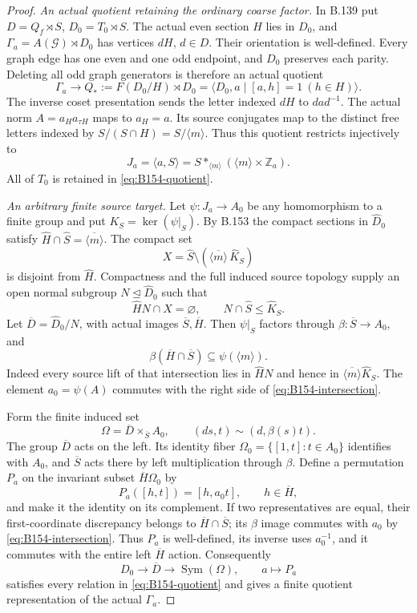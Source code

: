 \begin{proof}
\emph{An actual quotient retaining the ordinary coarse factor.}
In B.139 put $D=Q_f\rtimes S$, $D_0=T_0\rtimes S$.
The actual even section $H$ lies in $D_0$, and
$\Gamma_a=A(\mathcal G)\rtimes D_0$ has vertices $dH$, $d\in D$.
Their orientation is well-defined. Every graph edge has one even and
one odd endpoint, and $D_0$ preserves each parity. Deleting all odd
graph generators is therefore an actual quotient
\begin{equation}\label{eq:B154-quotient}
 \Gamma_a\longrightarrow Q_*:=F(D_0/H)\rtimes D_0
   =\langle D_0,a\mid[a,h]=1\ (h\in H)\rangle.
\end{equation}
The inverse coset presentation sends the letter indexed $dH$ to
$dad^{-1}$. The actual norm $A=a_Ha_{\tau H}$ maps to $a_H=a$.
Its source conjugates map to the distinct free letters indexed by
$S/(S\cap H)=S/\langle m\rangle$. Thus this quotient restricts
injectively to
\[
 J_a=\langle a,S\rangle
    =S*_{\langle m\rangle}(\langle m\rangle\times\mathbb Z_a).
\]
All of $T_0$ is retained in \eqref{eq:B154-quotient}.

\emph{An arbitrary finite source target.}
Let $\psi:J_a\to A_0$ be any homomorphism to a finite group and put
$K_S=\ker(\psi|_S)$. By B.153 the compact sections in
$\widehat D_0$ satisfy
$\widehat H\cap\widehat S=\overline{\langle m\rangle}$.
The compact set
\[
 X=\widehat S\setminus
       (\overline{\langle m\rangle}\,\widehat K_S)
\]
is disjoint from $\widehat H$. Compactness and the full induced
source topology supply an open normal subgroup $N\trianglelefteq
\widehat D_0$ such that
\[
 \widehat HN\cap X=\varnothing,
 \qquad N\cap\widehat S\le\widehat K_S.
\]
Let $\overline D=\widehat D_0/N$, with actual images
$\overline S,\overline H$. Then $\psi|_S$ factors through
$\beta:\overline S\to A_0$, and
\begin{equation}\label{eq:B154-intersection}
 \beta(\overline H\cap\overline S)\subseteq\psi(\langle m\rangle).
\end{equation}
Indeed every source lift of that intersection lies in $\widehat HN$
and hence in $\overline{\langle m\rangle}\widehat K_S$.
The element $a_0=\psi(A)$ commutes with the right side of
\eqref{eq:B154-intersection}.

Form the finite induced set
\[
 \Omega=\overline D\times_{\overline S}A_0,
 \qquad(ds,t)\sim(d,\beta(s)t).
\]
The group $\overline D$ acts on the left. Its identity fiber
$\Omega_0=\{[1,t]:t\in A_0\}$ identifies with $A_0$, and
$\overline S$ acts there by left multiplication through $\beta$.
Define a permutation $P_a$ on the invariant subset
$\overline H\Omega_0$ by
\[
 P_a([h,t])=[h,a_0t],\qquad h\in\overline H,
\]
and make it the identity on its complement. If two representatives
are equal, their first-coordinate discrepancy belongs to
$\overline H\cap\overline S$; its $\beta$ image commutes with $a_0$
by \eqref{eq:B154-intersection}. Thus $P_a$ is well-defined, its
inverse uses $a_0^{-1}$, and it commutes with the entire left
$\overline H$ action. Consequently
\[
 D_0\longrightarrow\overline D\longrightarrow\operatorname{Sym}(\Omega),
 \qquad a\longmapsto P_a
\]
satisfies every relation in \eqref{eq:B154-quotient} and gives a finite
quotient representation of the actual $\Gamma_a$.


\end{proof}
